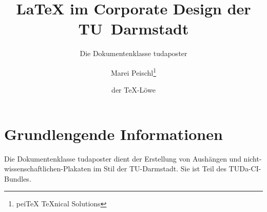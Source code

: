 \documentclass[
	paper=a0,
	ngerman,
	accentcolor=9c,
	logo=body,%
	footer=true,
	]{tudaposter}
\begin{document}
\title{\LaTeX{} im Corporate Design der TU~Darmstadt}
\subtitle{Die Dokumentenklasse tudaposter}
\author{Marei Peischl\thanks{pei\TeX{} \TeX{}nical Solutions}\and der \TeX-Löwe}

\titlegraphic{\color{red!20}\rule{\contentwidth}{.3\contentheight}}



\maketitle

\section*{Grundlengende Informationen}
Die Dokumentenklasse tudaposter dient der Erstellung von Aushängen und nicht-wissenschaftlichen-Plakaten im Stil der TU-Darmstadt. Sie ist Teil des TUDa-CI-Bundles.
\end{document}
